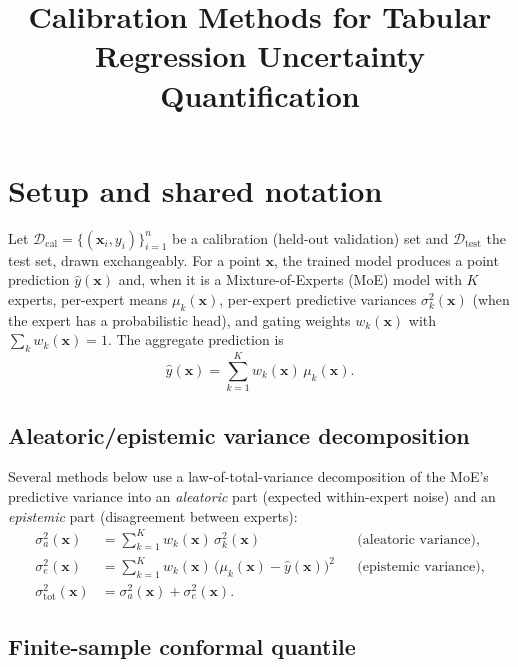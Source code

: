 \documentclass[11pt]{article}
\title{Calibration Methods for Tabular Regression Uncertainty Quantification}
\author{}
\date{}
\begin{document}
\maketitle

\section{Setup and shared notation}

Let $\mathcal{D}_{\mathrm{cal}} = \{(\bm{x}_i, y_i)\}_{i=1}^{n}$ be a calibration (held-out
validation) set and $\mathcal{D}_{\mathrm{test}}$ the test set, drawn exchangeably. For a point
$\bm{x}$, the trained model produces a point prediction $\hat{y}(\bm{x})$ and, when it is a
Mixture-of-Experts (MoE) model with $K$ experts, per-expert means $\mu_k(\bm{x})$, per-expert
predictive variances $\sigma_k^2(\bm{x})$ (when the expert has a probabilistic head), and gating
weights $w_k(\bm{x})$ with $\sum_k w_k(\bm{x}) = 1$. The aggregate prediction is
\begin{equation}
\hat{y}(\bm{x}) = \sum_{k=1}^{K} w_k(\bm{x})\,\mu_k(\bm{x}).
\end{equation}

\subsection{Aleatoric/epistemic variance decomposition}
\label{sec:decomposition}

Several methods below use a law-of-total-variance decomposition of the MoE's predictive variance
into an \emph{aleatoric} part (expected within-expert noise) and an \emph{epistemic} part
(disagreement between experts):
\begin{align}
\sigma_a^2(\bm{x}) &= \sum_{k=1}^{K} w_k(\bm{x})\,\sigma_k^2(\bm{x}) &&\text{(aleatoric variance)},
\label{eq:aleat}\\
\sigma_e^2(\bm{x}) &= \sum_{k=1}^{K} w_k(\bm{x})\,\big(\mu_k(\bm{x}) - \hat{y}(\bm{x})\big)^2
&&\text{(epistemic variance)}, \label{eq:epist}\\
\sigma_{\mathrm{tot}}^2(\bm{x}) &= \sigma_a^2(\bm{x}) + \sigma_e^2(\bm{x}). \label{eq:total}
\end{align}

\subsection{Finite-sample conformal quantile}
\label{sec:quantile}
\end{document}
